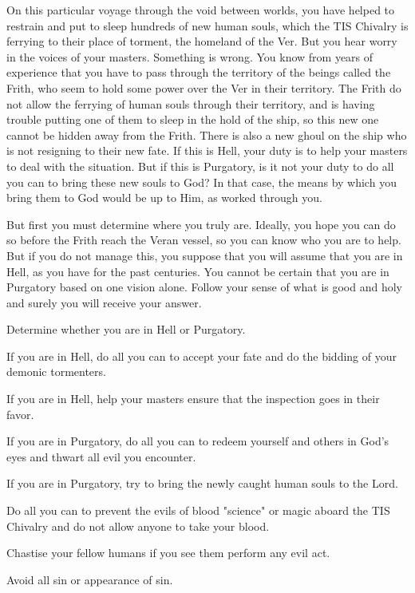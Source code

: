 \documentclass[char]{guildcamp4}
\begin{document}
On this particular voyage through the void between worlds, you have helped to restrain and put to sleep hundreds of new human souls, which the TIS Chivalry is ferrying to their place of torment, the homeland of the Ver. But you hear worry in the voices of your masters. Something is wrong. You know from years of experience that you have to pass through the territory of the beings called the Frith, who seem to hold some power over the Ver in their territory. The Frith do not allow the ferrying of human souls through their territory, and \cVthree{} is having trouble putting one of them to sleep in the hold of the ship, so this new one cannot be hidden away from the Frith. There is also a new ghoul on the ship who is not resigning to their new fate. If this is Hell, your duty is to help your masters to deal with the situation. But if this is Purgatory, is it not your duty to do all you can to bring these new souls to God? In that case, the means by which you bring them to God would be up to Him, as worked through you.

But first you must determine where you truly are. Ideally, you hope you can do so before the Frith reach the Veran vessel, so you can know who you are to help. But if you do not manage this, you suppose that you will assume that you are in Hell, as you have for the past centuries. You cannot be certain that you are in Purgatory based on one vision alone. Follow your sense of what is good and holy and surely you will receive your answer.

\begin{itemz}[Goals]
	\item Determine whether you are in Hell or Purgatory.
	\item If you are in Hell, do all you can to accept your fate and do the bidding of your demonic tormenters.
	\item If you are in Hell, help your masters ensure that the inspection goes in their favor.
	\item If you are in Purgatory, do all you can to redeem yourself and others in God's eyes and thwart all evil you encounter.
	\item If you are in Purgatory, try to bring the newly caught human souls to the Lord.
	\item Do all you can to prevent the evils of blood "science" or magic aboard the TIS Chivalry and do not allow anyone to take your blood.
	\item Chastise your fellow humans if you see them perform any evil act.
	\item Avoid all sin or appearance of sin.
\end{itemz}
\end{document}
